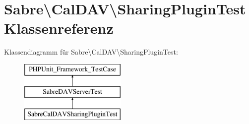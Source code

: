 \hypertarget{class_sabre_1_1_cal_d_a_v_1_1_sharing_plugin_test}{}\section{Sabre\textbackslash{}Cal\+D\+AV\textbackslash{}Sharing\+Plugin\+Test Klassenreferenz}
\label{class_sabre_1_1_cal_d_a_v_1_1_sharing_plugin_test}
Klassendiagramm für Sabre\textbackslash{}Cal\+D\+AV\textbackslash{}Sharing\+Plugin\+Test\+:\begin{figure}[H]
\begin{center}
\leavevmode
\includegraphics[height=3.000000cm]{class_sabre_1_1_cal_d_a_v_1_1_sharing_plugin_test}
\end{center}
\end{figure}
